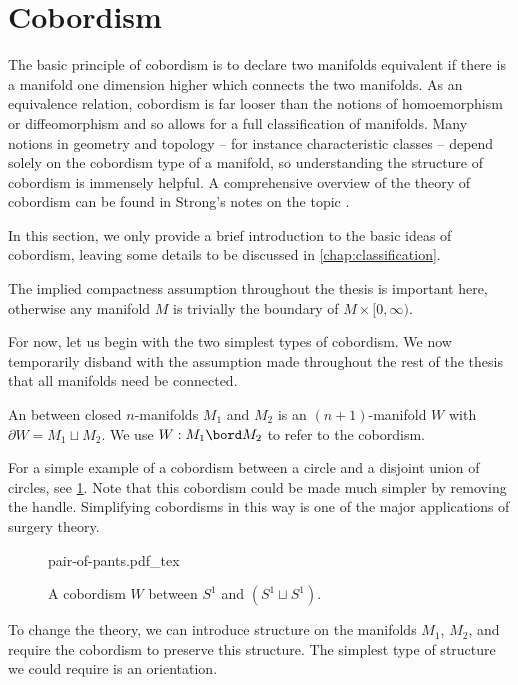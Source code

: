\pagebreak
\section{Cobordism}\label{sec:cobordism}

The basic principle of cobordism is to declare two manifolds equivalent if there is a manifold one dimension higher which connects the two manifolds. As an equivalence relation, cobordism is far looser than the notions of homoemorphism or diffeomorphism and so allows for a full classification of manifolds. Many notions in geometry and topology -- for instance characteristic classes -- depend solely on the cobordism type of a manifold, so understanding the structure of cobordism is immensely helpful. 
A comprehensive overview of the theory of cobordism can be found in Strong's notes on the topic \cite{strong1968cobordism}.

In this section, we only provide a brief introduction to the basic ideas of cobordism, leaving some details to be discussed in \cref{chap:classification}.

\begin{remark}
	The implied compactness assumption throughout the thesis is important here, otherwise any manifold $M$ is trivially the boundary of $M\times [0,\infty)$. 
\end{remark}

For now, let us begin with the two simplest types of cobordism. We now temporarily disband with the assumption made throughout the rest of the thesis that all manifolds need be connected.

\begin{definition}
	An  between closed $n$-manifolds $M_1$ and $M_2$ is an $(n+1)$-manifold $W$ with $\partial W = M_1\sqcup M_2$. We use $W : M_1\bord M_2$ to refer to the cobordism.
\end{definition}

For a simple example of a cobordism between a circle and a disjoint union of circles, see \cref{fig:pair-of-pants}. Note that this cobordism could be made much simpler by removing the handle. Simplifying cobordisms in this way is one of the major applications of surgery theory.
\begin{figure}[ht]
	\centering
	{pair-of-pants.pdf_tex}
	\caption{A cobordism $W$ between $S^1$ and $(S^1\sqcup S^1)$.}\label{fig:pair-of-pants}
\end{figure}

To change the theory, we can introduce structure on the manifolds $M_1$, $M_2$, and require the cobordism to preserve this structure. The simplest type of structure we could require is an orientation.

